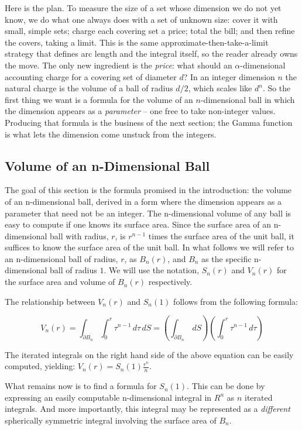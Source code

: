 Here is the plan. To measure the size of a set whose dimension we do
not yet know, we do what one always does with a set of unknown size:
cover it with small, simple sets; charge each covering set a price;
total the bill; and then refine the covers, taking a limit. This is
the same approximate-then-take-a-limit strategy that defines arc
length and the integral itself, so the reader already owns the move.
The only new ingredient is the {\it price\/}: what should an
$\alpha$-dimensional accounting charge for a covering set of diameter
$d$? In an integer dimension $n$ the natural charge is the volume of a
ball of radius $d/2$, which scales like $d^n$. So the first thing we
want is a formula for the volume of an $n$-dimensional ball in which
the dimension appears as a {\it parameter\/} -- one free to take
non-integer values. Producing that formula is the business of the next
section; the Gamma function is what lets the dimension come unstuck
from the integers.

\eject

\subsection{Volume of an n-Dimensional Ball}
The goal of this section is the formula promised in the introduction:
the volume of an n-dimensional ball, derived in a form where the
dimension appears as a parameter that need not be an integer.
The n-dimensional volume of any ball is easy to compute if one
knows its surface area. Since the surface area of an n-dimensional ball 
with radius, $r$, is $r^{n-1}$ times the surface area of the unit ball, 
it suffices to know the surface area of the unit ball.
In what follows we will refer to an n-dimensional ball of radius, $r$, 
as $B_n(r)$, and $B_n$ as the specific n-dimensional ball of radius $1$.
We will use the notation, $S_n(r)$ and $V_n(r)$ for the surface area and volume 
of $B_n(r)$ respectively.

The relationship between $V_n(r)$ and $S_n(1)$ 
follows from the following formula:%

$$
{V}_n(r) =  \int_{\partial B_n} \int_0^r \tau^{n-1} \,d\tau \,dS = \left(\int_{\partial B_n} \, dS\right) \left( \int_0^r \tau^{n-1} \, d\tau \right)
$$

The iterated integrals on the right hand side of the above equation can 
be easily computed, yielding: ${V}_n(r) = {S}_n(1) \frac{r^n}{n}$.

What remains now is to find a formula for $S_n(1)$.
This can be done by expressing an easily computable 
n-dimensional integral in $R^n$ as $n$ iterated integrals. 
And more importantly, this integral may be represented as a {\it different\/} 
spherically symmetric integral involving the surface area of $B_n$.

